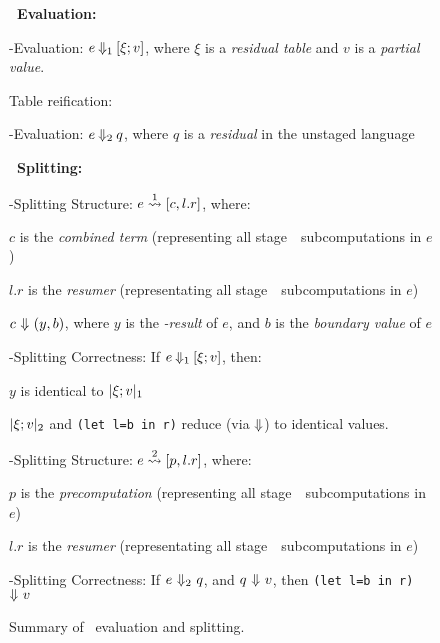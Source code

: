 \begin{figure*}

\textbf{\lang\ Evaluation:}

\hspace{2em}\bbone-Evaluation: $e\mathbin{{\Downarrow_{ 1}}}[\xi;v]$, where $\xi$ is a \emph{residual table} and $v$ is a \emph{partial value}. 

\hspace{2em}Table reification: 

\hspace{2em}\bbtwo-Evaluation: $e\mathbin{{\Downarrow_{ 2}}}q$, where $q$ is a \emph{residual} in the unstaged language \langTwo




\vspace{.75em}
\textbf{\lang\ Splitting:}

\hspace{2em}\bbone-Splitting Structure: $e \overset{ 1}\rightsquigarrow [c,l.r]$, where:

\hspace{4em}$c$ is the \emph{combined term} (representing all stage~\bbone\ subcomputations in $e$)

\hspace{4em}$l.r$ is the \emph{resumer} (representating all stage~\bbtwo\ subcomputations in $e$)

\hspace{4em}$c~{\Downarrow}~(y,b)$, where $y$ is the \emph{\bbone-result} of $e$, and $b$ is the \emph{boundary value} of $e$

 
\hspace{2em}\bbone-Splitting Correctness: If $e\mathbin{{\Downarrow_{ 1}}}[\xi;v]$, then:

\hspace{4em}$y$ is identical to $|\xi;v|_{ 1}$

\hspace{4em}$|\xi;v|_{ 2}$ and \texttt{(let l=b in r)} reduce (via ${\Downarrow}$) to identical values.  

\hspace{2em}\bbtwo-Splitting Structure: $e \overset{ 2}\rightsquigarrow [p,l.r]$, where:

\hspace{4em}$p$ is the \emph{precomputation} (representing all stage~\bbone\ subcomputations in $e$)

\hspace{4em}$l.r$ is the \emph{resumer} (representating all stage~\bbtwo\ subcomputations in $e$)

\hspace{2em}\bbtwo-Splitting Correctness: If $e~{\Downarrow_{ 2}}~q$, and $q~{\Downarrow}~v$, then \texttt{(let l=b in r)}~${\Downarrow}~v$


\caption{Summary of \lang\ evaluation and splitting.}
\label{fig:terminology}
\end{figure*}

